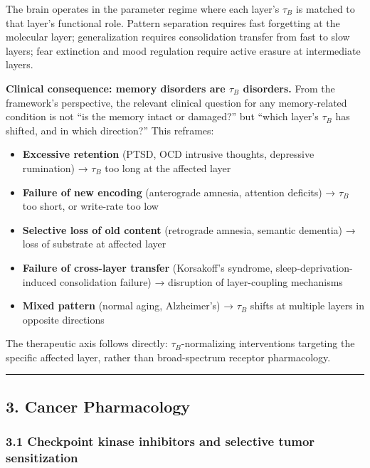 \documentclass[
]{article}
\providecommand{\tightlist}{%
  \setlength{\itemsep}{0pt}\setlength{\parskip}{0pt}}
\begin{document}
The brain operates in the parameter regime where each layer's \(\tau_B\)
is matched to that layer's functional role. Pattern separation requires
fast forgetting at the molecular layer; generalization requires
consolidation transfer from fast to slow layers; fear extinction and
mood regulation require active erasure at intermediate layers.

\textbf{Clinical consequence: memory disorders are \(\tau_B\)
disorders.} From the framework's perspective, the relevant clinical
question for any memory-related condition is not ``is the memory intact
or damaged?'' but ``which layer's \(\tau_B\) has shifted, and in which
direction?'' This reframes:

\begin{itemize}
\tightlist
\item
  \textbf{Excessive retention} (PTSD, OCD intrusive thoughts, depressive
  rumination) → \(\tau_B\) too long at the affected layer
\item
  \textbf{Failure of new encoding} (anterograde amnesia, attention
  deficits) → \(\tau_B\) too short, or write-rate too low
\item
  \textbf{Selective loss of old content} (retrograde amnesia, semantic
  dementia) → loss of substrate at affected layer
\item
  \textbf{Failure of cross-layer transfer} (Korsakoff's syndrome,
  sleep-deprivation-induced consolidation failure) → disruption of
  layer-coupling mechanisms
\item
  \textbf{Mixed pattern} (normal aging, Alzheimer's) → \(\tau_B\) shifts
  at multiple layers in opposite directions
\end{itemize}

The therapeutic axis follows directly: \(\tau_B\)-normalizing
interventions targeting the specific affected layer, rather than
broad-spectrum receptor pharmacology.

\begin{center}\rule{0.5\linewidth}{0.5pt}\end{center}

\hypertarget{cancer-pharmacology}{%
\subsection{3. Cancer Pharmacology}\label{cancer-pharmacology}}

\hypertarget{checkpoint-kinase-inhibitors-and-selective-tumor-sensitization}{%
\subsubsection{3.1 Checkpoint kinase inhibitors and selective tumor
sensitization}\label{checkpoint-kinase-inhibitors-and-selective-tumor-sensitization}}
\end{document}
